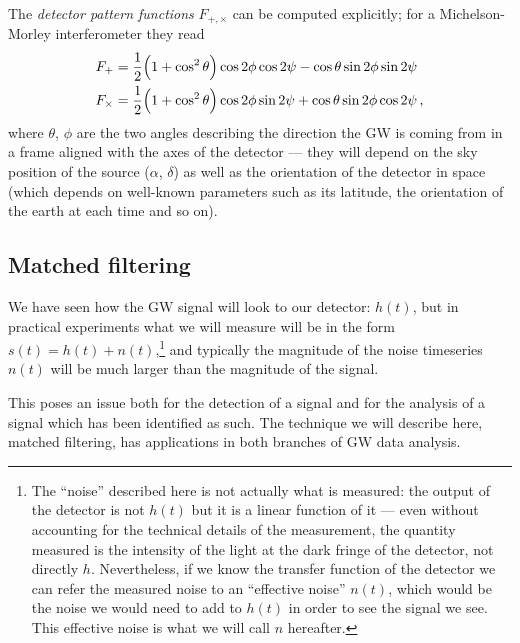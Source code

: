\documentclass[main.tex]{subfiles}
\begin{document}
The \emph{detector pattern functions} \(F_{+, \times }\) can be computed explicitly; for a Michelson-Morley interferometer they read 
%
\begin{subequations}
\begin{align}
F_{+} &= \frac{1}{2} \qty(1 + \cos^2 \theta ) \cos 2 \phi \cos 2 \psi - \cos \theta \sin 2 \phi \sin 2 \psi   \\
F_{ \times } &= \frac{1}{2} \qty(1 + \cos^2 \theta ) \cos 2 \phi \sin 2 \psi + \cos \theta \sin 2 \phi \cos 2 \psi  
\,,
\end{align}
\end{subequations}
%
where \(\theta \), \(\phi \) are the two angles describing the direction the \ac{GW} is coming from in a frame aligned with the axes of the detector --- they will depend on the sky position of the source (\(\alpha \), \(\delta \)) as well as the orientation of the detector in space (which depends on well-known parameters such as its latitude, the orientation of the earth at each time and so on).

\subsection{Matched filtering}

We have seen how the \ac{GW} signal will look to our detector: \(h(t)\), but in practical experiments what we will measure will be in the form \(s(t) = h(t) + n(t)\),\footnote{The ``noise'' described here is not actually what is measured: the output of the detector is not \(h(t)\) but it is a linear function of it --- even without accounting for the technical details of the measurement, the quantity measured is the intensity of the light at the dark fringe of the detector, not directly \(h\). Nevertheless, if we know the transfer function of the detector we can refer the measured noise to an ``effective noise'' \(n(t)\), which would be the noise we would need to add to \(h(t)\) in order to see the signal we see. This effective noise is what we will call \(n\) hereafter.} and typically the magnitude of the noise timeseries \(n(t)\) will be much larger than the magnitude of the signal. 

This poses an issue both for the detection of a signal and for the analysis of a signal which has been identified as such. 
The technique we will describe here, matched filtering, has applications in both branches of \ac{GW} data analysis.
\end{document}
